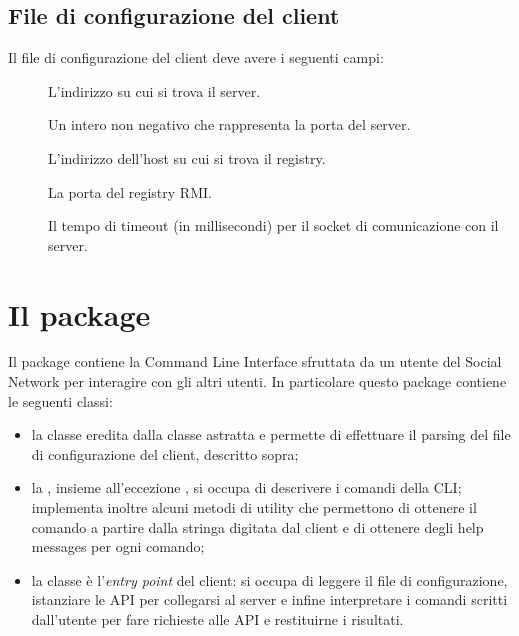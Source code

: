 \documentclass[
    oneside,
    10pt,
    language=italian,
    a4paper,
    article
]{notes}
\begin{document}
\subsection{File di configurazione del client}
Il file di configurazione del client deve avere i seguenti campi:
\begin{description}
    \item[] L'indirizzo su cui si trova il server.
    \item[] Un intero non negativo che rappresenta la porta del server.
    \item[] L'indirizzo dell'host su cui si trova il registry.
    \item[] La porta del registry RMI.
    \item[] Il tempo di timeout (in millisecondi) per il socket
        di comunicazione con il server.      
\end{description}

\section{Il package } \label{sec:client}
Il package  contiene la Command Line Interface sfruttata
da un utente del Social Network per interagire con gli altri utenti. 
In particolare questo package contiene le seguenti classi:
\begin{itemize}
    \item la classe  eredita dalla classe astratta 
         e permette di effettuare
        il parsing del file di configurazione del client, descritto sopra;
    \item la  , insieme all'eccezione 
        , si occupa di descrivere i
        comandi della CLI; implementa inoltre alcuni metodi di utility che
        permettono di ottenere il comando a partire dalla stringa digitata dal
        client e di ottenere degli help messages per ogni comando;
    \item la classe  è l'\emph{entry point} del client:
        si occupa di leggere il file di configurazione, istanziare le API per
        collegarsi al server e infine interpretare i comandi scritti dall'utente
        per fare richieste alle API e restituirne i risultati.
\end{itemize}
\end{document}
